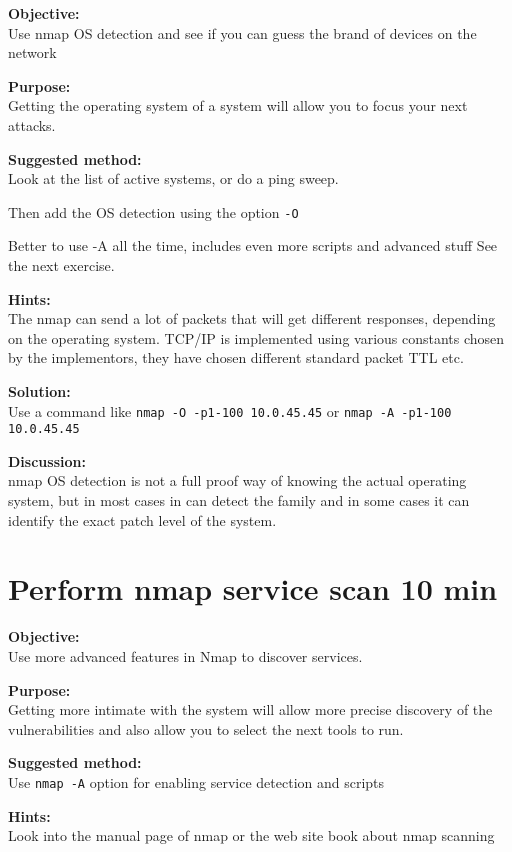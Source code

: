 \documentclass[a4paper,11pt,notitlepage]{report}
\begin{document}
{\bf Objective:} \\
Use nmap OS detection and see if you can guess the brand of devices on the network

{\bf Purpose:}\\
Getting the operating system of a system will allow you to focus your next attacks.

{\bf Suggested method:}\\
Look at the list of active systems, or do a ping sweep.

Then add the OS detection using the option \verb+-O+

Better to use -A all the time, includes even more scripts and advanced stuff
See the next exercise.

{\bf Hints:} \\

The nmap can send a lot of packets that will get different responses, depending on the operating system. TCP/IP is implemented using various constants chosen by the implementors, they have chosen different standard packet TTL etc.

{\bf Solution:}\\
Use a command like \verb+nmap -O -p1-100 10.0.45.45+ or  \verb+nmap -A -p1-100 10.0.45.45+


{\bf Discussion:}\\
nmap OS detection is not a full proof way of knowing the actual operating system, but in most cases in can detect the family and in some cases it can identify the exact patch level of the system.

\chapter{Perform nmap service scan 10 min}
\label{ex:nmap-service}

{\bf Objective:} \\
Use more advanced features in Nmap to discover services.

{\bf Purpose:}\\
Getting more intimate with the system will allow more precise discovery of the vulnerabilities and also allow you to select the next tools to run.

{\bf Suggested method:}\\
Use \verb+nmap -A+ option for enabling service detection and scripts

{\bf Hints:} \\
Look into the manual page of nmap or the web site book about nmap scanning
\end{document}
